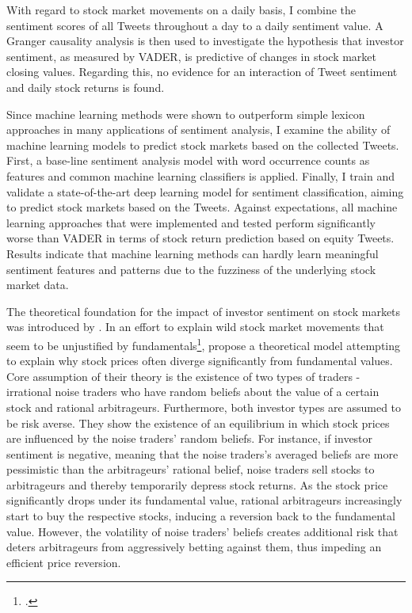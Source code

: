 \documentclass[a4paper,12pt]{article}%
\begin{document}
With regard to stock market movements on a daily basis, I combine the sentiment scores of all Tweets throughout a day to a daily sentiment value. A Granger causality analysis is then used to investigate the hypothesis that investor sentiment, as measured by VADER, is predictive of changes in stock market closing values. Regarding this, no evidence for an interaction of Tweet sentiment and daily stock returns is found.

Since machine learning methods were shown to outperform simple lexicon approaches in many applications of sentiment analysis, I examine the ability of machine learning models to predict stock markets based on the collected Tweets. First, a base-line sentiment analysis model with word occurrence counts as features and common machine learning classifiers is applied. Finally, I train and validate a state-of-the-art deep learning model for sentiment classification, aiming to predict stock markets based on the Tweets. Against expectations, all machine learning approaches that were implemented and tested perform significantly worse than VADER in terms of stock return prediction based on equity Tweets. Results indicate that machine learning methods can hardly learn meaningful sentiment features and patterns due to the fuzziness of the underlying stock market data.

The theoretical foundation for the impact of investor sentiment on stock markets was introduced by \citet{DeLong1990}.
In an effort to explain wild stock market movements that seem to be unjustified by fundamentals\footcite{Tetlock2007}, \citeauthor{DeLong1990} propose a theoretical model attempting to explain why stock prices often diverge significantly from fundamental values. Core assumption of their theory is the existence of two types of traders - irrational noise traders who have random beliefs about the value of a certain stock and rational arbitrageurs. Furthermore, both investor types are assumed to be risk averse. They show the existence of an equilibrium in which stock prices are influenced by the noise traders' random beliefs. For instance, if investor sentiment is negative, meaning that the noise traders's averaged beliefs are more pessimistic than the arbitrageurs' rational belief, noise traders sell stocks to arbitrageurs and thereby temporarily depress stock returns. As the stock price significantly drops under its fundamental value, rational arbitrageurs increasingly start to buy the respective stocks, inducing a reversion back to the fundamental value. However, the volatility of noise traders' beliefs creates additional risk that deters arbitrageurs from aggressively betting against them, thus impeding an efficient price reversion.
\end{document}
